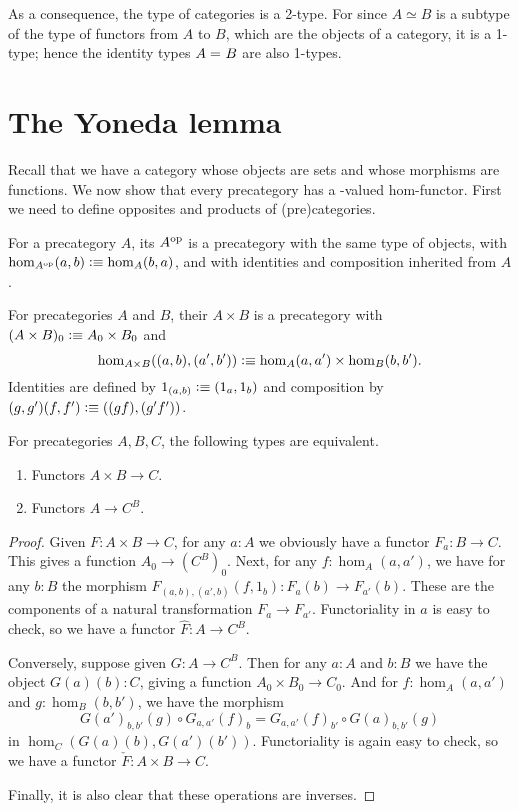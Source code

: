 As a consequence, the type of categories is a 2-type.
For since $A\simeq B$ is a subtype of the type of functors from $A$ to $B$, which are the objects of a category, it is a 1-type; hence the identity types $A =_{} B$ are also 1-types.


\section{The Yoneda lemma}
\label{sec:yoneda}

Recall that we have a category \uset whose objects are sets and whose morphisms are functions.
We now show that every precategory has a \uset-valued hom-functor.
First we need to define opposites and products of (pre)categories.

\begin{defn}
  For a precategory $A$, its  $A^{\textrm{op}}$ is a precategory with the same type of objects, with $\hom_{A^{\textrm{op}}}(a,b) \vcentcolon\equiv \hom_A(b,a)$, and with identities and composition inherited from $A$.
\end{defn}

\begin{defn}
  For precategories $A$ and $B$, their  $A\times B$ is a precategory with $(A\times B)_0 \vcentcolon\equiv A_0 \times B_0$ and
  \[\hom_{A\times B}((a,b),(a',b')) \vcentcolon\equiv \hom_A(a,a') \times \hom_B(b,b').\]
  Identities are defined by $1_{(a,b)}\vcentcolon\equiv (1_a,1_b)$ and composition by $(g,g')(f,f') \vcentcolon\equiv ((gf),(g'f'))$.
\end{defn}

\begin{lem}\label{ct:functorexpadj}
  For precategories $A,B,C$, the following types are equivalent.
  \begin{enumerate}
  \item Functors $A\times B\to C$.
  \item Functors $A\to C^B$.
  \end{enumerate}
\end{lem}
\begin{proof}
  Given $F:A\times B\to C$, for any $a:A$ we obviously have a functor $F_a : B\to C$.
  This gives a function $A_0 \to (C^B)_0$.
  Next, for any $f:\hom_A(a,a')$, we have for any $b:B$ the morphism $F_{(a,b),(a',b)}(f,1_b):F_a(b) \to F_{a'}(b)$.
  These are the components of a natural transformation $F_a \to F_{a'}$.
  Functoriality in $a$ is easy to check, so we have a functor $\hat{F}:A\to C^B$.

  Conversely, suppose given $G:A\to C^B$.
  Then for any $a:A$ and $b:B$ we have the object $G(a)(b):C$, giving a function $A_0 \times B_0 \to C_0$.
  And for $f:\hom_A(a,a')$ and $g:\hom_B(b,b')$, we have the morphism
  \begin{equation*}
     G(a')_{b,b'}(g)\circ G_{a,a'}(f)_b = G_{a,a'}(f)_{b'} \circ  G(a)_{b,b'}(g)
  \end{equation*}
  in $\hom_C(G(a)(b), G(a')(b'))$.
  Functoriality is again easy to check, so we have a functor $\check{F}:A\times B \to C$.

  Finally, it is also clear that these operations are inverses.
\end{proof}

